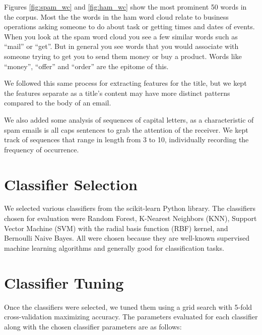 \documentclass[12pt]{article}
\begin{document}
\begin{multicols}{2}
\begin{minipage}{0.48\columnwidth}
                \label{fig:ham_wc}
             \end{minipage}

             Figures \ref{fig:spam_wc} and \ref{fig:ham_wc} show
             the most prominent 50 words in the corpus. Most the the words in the
             ham word cloud relate to business operations asking someone to do about
             task or getting times and dates of events. When you look at the spam
             word cloud you see a few similar words such as ``mail'' or ``get''.
             But in general you see words that you would associate with someone trying
             to get you to send them money or buy a product. Words like ``money'',
             ``offer'' and ``order'' are the epitome of this.

             We followed this same process for extracting features for the title, but
             we kept the features separate as a title's content may have more distinct
             patterns compared to the body of an email.

             We also added some analysis of sequences of capital letters, as a characteristic
             of spam emails is all caps sentences to grab the attention of the receiver. We
             kept track of sequences that range in length from 3 to 10, individually recording
             the frequency of occurrence.
        
        \section{Classifier Selection}
        
            We selected various classifiers from the scikit-learn Python library. The 
            classifiers chosen for evaluation were Random Forest, K-Nearest Neighbors (KNN), 
            Support Vector Machine (SVM) with the radial basis function (RBF) kernel, and Bernoulli 
            Naive Bayes. All were chosen because they are well-known supervised machine learning 
            algorithms and generally good for classification tasks. 
        
        \section{Classifier Tuning}
            Once the classifiers were selected, we tuned them using a grid search with 5-fold 
            cross-validation maximizing accuracy. The parameters evaluated for each classifier along 
            with the chosen classifier parameters are as follows:
            

\end{multicols}
\end{document}
